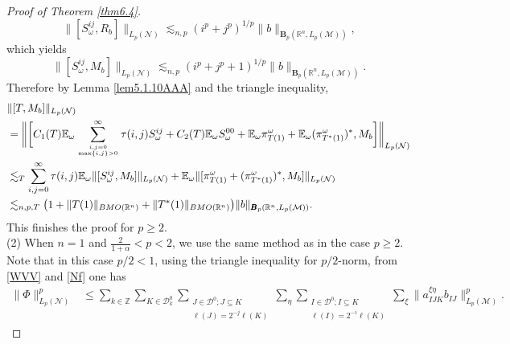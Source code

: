 \documentclass[oneside,english,a4wide]{amsart}
\numberwithin{equation}{section}
\numberwithin{figure}{section}
\theoremstyle{plain}
\theoremstyle{plain}
\theoremstyle{definition}
\theoremstyle{plain}
\theoremstyle{remark}
\theoremstyle{definition}
\theoremstyle{remark}
\theoremstyle{definition}
\newcommand{\8}{\infty}
\begin{document}
\begin{proof}[Proof of Theorem \ref{thm6.4}]
	$$ \|[S_\omega^{ij}, R_b]\|_{L_p(\mathcal{N})}\lesssim_{n, p} (i^p+j^p)^{1/p}  \|b\|_{\pmb{B}_p(\mathbb{R}^n,L_p(\mathcal{M}))}, $$
	which yields
	$$ \|[S_\omega^{ij}, M_b]\|_{L_p(\mathcal{N})}\lesssim_{n, p} (i^p+j^p+1)^{1/p}  \|b\|_{\pmb{B}_p(\mathbb{R}^n,L_p(\mathcal{M}))}. $$
	Therefore by Lemma \ref{lem5.1.10AAA} and the triangle inequality,
	\begin{equation*}
		\begin{aligned}
			{}&\|[T,M_b]\|_{L_p(\mathcal{N})}\\
			&=\biggl\|\biggl[C_1(T)\mathbb{E}_\omega\sum_{i,j=0\atop \max\{i,j\}>0}^\infty \tau(i,j)S_\omega^{ij}+C_2(T)\mathbb{E}_\omega S_\omega^{00}+\mathbb{E}_\omega \pi^\omega_{T(1)}+\mathbb{E}_\omega (\pi^\omega_{T^*(1)})^*,M_b\biggr]\biggr\|_{L_p(\mathcal{N})}\\
			&\lesssim_T \sum_{i,j=0}^\infty \tau(i,j)\mathbb{E}_\omega\|[S_\omega^{ij},M_b]\|_{L_p(\mathcal{N})}+\mathbb{E}_\omega\|[ \pi^\omega_{T(1)}+ (\pi^\omega_{T^*(1)})^*,M_b]\|_{L_p(\mathcal{N})} \\
			&\lesssim_{n,p, T} \big(1+\|T(1)\|_{BMO(\mathbb{R}^n)}+\|T^*(1)\|_{BMO(\mathbb{R}^n)}\big) \|b\|_{\pmb{B}_p(\mathbb{R}^n,L_p(\mathcal{M}))}.
		\end{aligned}
	\end{equation*}
	This finishes the proof for $p\geq 2$.
\\
(2) When $n=1$ and $\frac{2}{1+\alpha}< p<2$, we use the same method as in the case $p\ge 2$. Note that in this case $p/2<1$, using the triangle inequality for $p/2$-norm,  from \eqref{WVV} and \eqref{Nf} one has
\begin{equation*}
	\begin{aligned}
		\|\varPhi\|_{L_p(\mathcal{N})}^p{}&\le \sum_{k\in\mathbb{Z}}\sum_{K\in\mathcal{D}^0_k}\sum_{\substack{J\in\mathcal{D}^0;J\subseteq K\\ \ell(J)=2^{-j}\ell(K)}}\sum_{\eta}\sum_{\substack{I\in\mathcal{D}^0;I\subseteq K \\ \ell(I)=2^{-i}\ell(K)}}\sum_{ \xi}\Big\|a_{IJK}^{\xi\eta} b_{IJ}\Big\|_{L_{p}(\mathcal{M})}^p.
	\end{aligned}
\end{equation*}

\end{proof}
\end{document}
